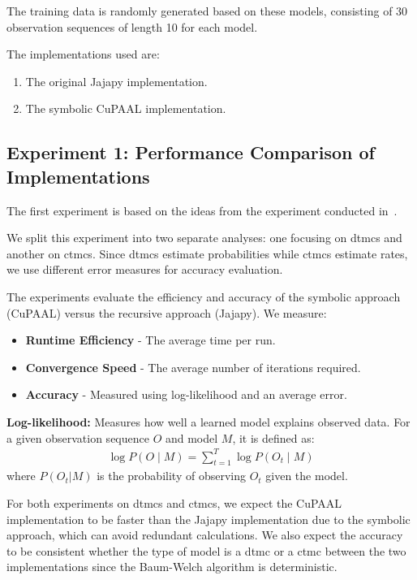 The training data is randomly generated based on these models, consisting of 30 observation sequences of length 10 for each model.

The implementations used are:
\begin{enumerate}
    \item The original Jajapy implementation.
    \item The symbolic CuPAAL implementation.
\end{enumerate}

\subsection{Experiment 1: Performance Comparison of Implementations}
The first experiment is based on the ideas from the experiment conducted in~\cite{reynouard2024learning}.

We split this experiment into two separate analyses: one focusing on \glspl{dtmc} and another on \glspl{ctmc}. Since \glspl{dtmc} estimate probabilities while \glspl{ctmc} estimate rates, we use different error measures for accuracy evaluation.

The experiments evaluate the efficiency and accuracy of the symbolic approach (CuPAAL) versus the recursive approach (Jajapy). We measure:
\begin{itemize}
    \item \textbf{Runtime Efficiency} - The average time per run.
    \item \textbf{Convergence Speed} - The average number of iterations required.
    \item \textbf{Accuracy} - Measured using log-likelihood and an average error.
\end{itemize}

\textbf{Log-likelihood:} Measures how well a learned model explains observed data.
For a given observation sequence $O$ and model $M$, it is defined as:
\begin{equation}
    \begin{aligned}
        \log P(O \mid M) = \sum_{t=1}^{T} \log P(O_t \mid M)
    \end{aligned}
\end{equation}
where $P(O_t|M)$ is the probability of observing $O_t$ given the model.

For both experiments on \glspl{dtmc} and \glspl{ctmc}, we expect the CuPAAL implementation to be faster than the Jajapy implementation due to the symbolic approach, which can avoid redundant calculations.
We also expect the accuracy to be consistent whether the type of model is a \gls{dtmc} or a \gls{ctmc} between the two implementations since the Baum-Welch algorithm is deterministic.

